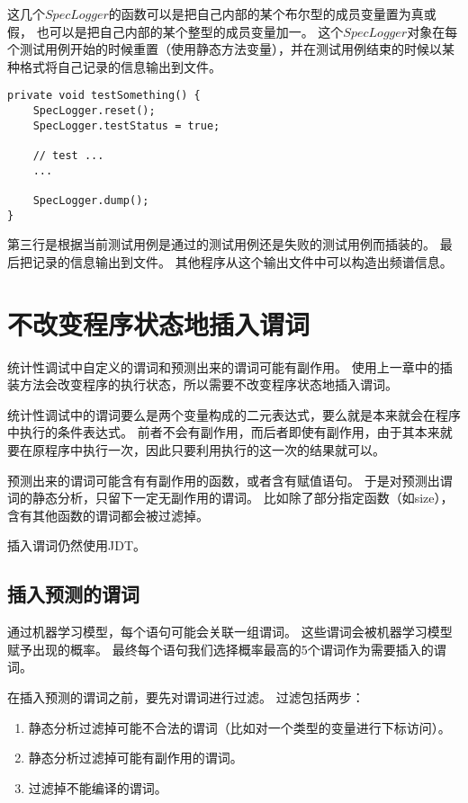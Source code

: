 这几个$SpecLogger$的函数可以是把自己内部的某个布尔型的成员变量置为真或假，
也可以是把自己内部的某个整型的成员变量加一。
这个$SpecLogger$对象在每个测试用例开始的时候重置（使用静态方法变量），并在测试用例结束的时候以某种格式将自己记录的信息输出到文件。
\lstset{language=Java}
\begin{lstlisting}
private void testSomething() {
	SpecLogger.reset();
    SpecLogger.testStatus = true;

    // test ...
    ...

    SpecLogger.dump();
}
\end{lstlisting}
第三行是根据当前测试用例是通过的测试用例还是失败的测试用例而插装的。
最后把记录的信息输出到文件。
其他程序从这个输出文件中可以构造出频谱信息。

\section{不改变程序状态地插入谓词}

统计性调试中自定义的谓词和预测出来的谓词可能有副作用。
使用上一章中的插装方法会改变程序的执行状态，所以需要不改变程序状态地插入谓词。

统计性调试中的谓词要么是两个变量构成的二元表达式，要么就是本来就会在程序中执行的条件表达式。
前者不会有副作用，而后者即使有副作用，由于其本来就要在原程序中执行一次，因此只要利用执行的这一次的结果就可以。

预测出来的谓词可能含有有副作用的函数，或者含有赋值语句。
于是对预测出谓词的静态分析，只留下一定无副作用的谓词。
比如除了部分指定函数（如size），含有其他函数的谓词都会被过滤掉。

插入谓词仍然使用JDT。

\subsection{插入预测的谓词}

通过机器学习模型，每个语句可能会关联一组谓词。
这些谓词会被机器学习模型赋予出现的概率。
最终每个语句我们选择概率最高的5个谓词作为需要插入的谓词。

在插入预测的谓词之前，要先对谓词进行过滤。
过滤包括两步：
\begin{enumerate}
\item 静态分析过滤掉可能不合法的谓词（比如对一个类型的变量进行下标访问）。
\item 静态分析过滤掉可能有副作用的谓词。
\item 过滤掉不能编译的谓词。
\end{enumerate}

